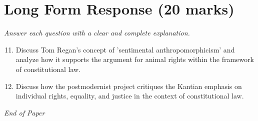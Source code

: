 \documentclass[12pt]{article}
\begin{document}
\section*{Long Form Response (20 marks)}
\textit{Answer each question with a clear and complete explanation.}
\begin{enumerate}[label=\arabic*.]
\setcounter{enumi}{10}
\item Discuss Tom Regan's concept of 'sentimental anthropomorphicism' and analyze how it supports the argument for animal rights within the framework of constitutional law.
\item Discuss how the postmodernist project critiques the Kantian emphasis on individual rights, equality, and justice in the context of constitutional law.
\end{enumerate}

\vfill
\noindent\textit{End of Paper}
\end{document}
